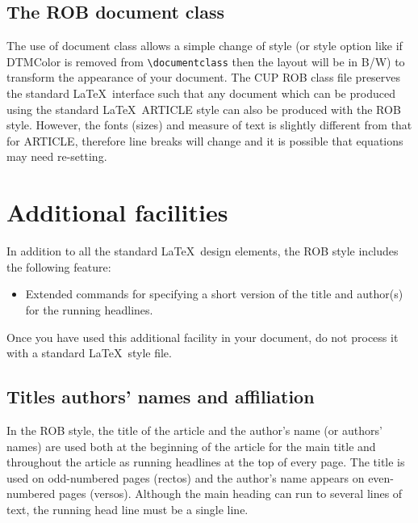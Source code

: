 \documentclass[DTMColor]{ROB-New}
\begin{document}
\subsection{The ROB document class}

The use of document class allows a simple change of style (or style option like if DTMColor is removed from \verb"\documentclass" then the layout will be in B/W)
to transform the appearance of your document. The CUP ROB class file preserves
the standard \LaTeX\ interface such that any document which can be produced
using the standard \LaTeX\ ARTICLE style can also be produced with the
ROB style. However, the fonts (sizes) and measure of text is slightly different
from that for ARTICLE, therefore line breaks will change and it is possible
that equations may need re-setting.

\section{Additional facilities}

In addition to all the standard \LaTeX\ design elements, the ROB style
includes the following feature:
\begin{itemize}
  \item Extended commands for specifying a short version
        of the title and author(s) for the running
        headlines.
\end{itemize}
Once you have used this additional facility in your document,
do not process it with a standard \LaTeX\ style file.

\subsection{Titles authors' names and affiliation}

In the ROB style, the title of the article and the author's name (or authors'
names) are used both at the beginning of the article for the main title and
throughout the article as running headlines at the top of every page.
The title is used on odd-numbered pages (rectos) and the author's name appears
on even-numbered pages (versos).
Although the main heading can run to several lines of text, the running head
line must be a single line.
\end{document}
